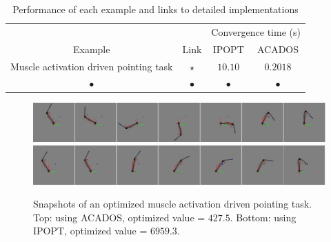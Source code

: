  
%
\begin{table}[h!]
\caption{\small Performance of each example and links to detailed implementations}
\label{tab:Perfs_and_detailed_implementations_of_each_example}
\centering
\begin{tabular}{c c c c}
&  & \multicolumn{2}{c}{Convergence time (s)} \\
\cmidrule[\heavyrulewidth]{3-4}
Example & Link & IPOPT & ACADOS \\ 
\midrule
Muscle activation driven pointing task & \href{https://github.com/pyomeca/BiorbdOptim/blob/master/examples/muscle_driven_ocp/static_arm.py}{$\star$} & $10.10$ & $0.2018$  \\ 
\midrule
$\bullet$ & $\bullet$ & $\bullet$ & $\bullet$ \\ 
\bottomrule
\end{tabular}
\end{table}
%

%
\begin{figure}[t!]
\centering
\includegraphics[width=\textwidth]{figures/activation_pointing_snapshots_acados.png}\\
\vspace*{0.5em}
\includegraphics[width=\textwidth]{figures/activation_pointing_snapshots_ipopt.png}
\caption{Snapshots of an optimized muscle activation driven pointing task. Top: using ACADOS, optimized value = $427.5$. Bottom: using IPOPT, optimized value = $6959.3$.}
\label{fig:snapshots_activation_driven_pointing}
\end{figure}
%